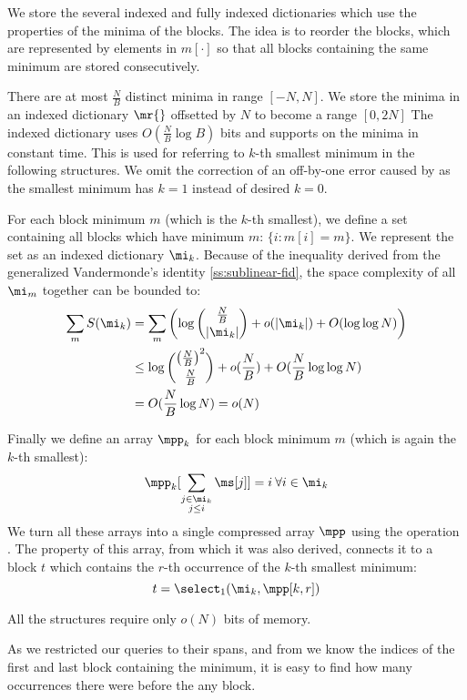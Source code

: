 We store the several indexed and fully indexed dictionaries which use the properties of the minima of the blocks.
The idea is to reorder the blocks, which are represented by elements in $m[\cdot]$ so that all blocks containing the same minimum are stored consecutively. 

There are at most $\frac{N}{B}$ distinct minima in range $[-N, N]$.
We store the minima in an indexed dictionary $\mr{}$ offsetted by $N$ to become a range $[0, 2 N]$
The indexed dictionary uses $O(\frac{N}{B} \log B)$ bits and supports \rank{} on the minima in constant time.
This is used for referring to $k$-th smallest minimum in the following structures.
We omit the correction of an off-by-one error caused by \rank{} as the smallest minimum has $k = 1$ instead of desired $k = 0$.

For each block minimum $m$ (which is the $k$-th smallest), we define a set containing all blocks which have minimum $m$: $\{ i : m[i] = m\}$.
We represent the set as an indexed dictionary $\mi_k$.
Because of the inequality derived from the generalized Vandermonde's identity \ref{ss:sublinear-fid}, the space complexity of all $\mi_m$ together can be bounded to:
\begin{align*}
	\sum_m S(\mi_k) &= \sum_m \left( \log {\frac{N}{B} \choose |\mi_k|} + o(|\mi_k|) + O(\log \log N) \right) \\
	&\le \log {\left(\frac{N}{B}\right)^2 \choose \frac{N}{B}} + o(\frac{N}{B}) + O(\frac{N}{B} \log \log N) \\
	&= O(\frac{N}{B} \log N) = o(N)
\end{align*}

Finally we define an array $\mpp_k$ for each block minimum $m$ (which is again the $k$-th smallest):
$$\mpp_k[\sum_{\substack{j \in \mi_k \\ j \le i}} \ms[j] ] = i \:\forall i \in \mi_k$$
We turn all these arrays into a single compressed array $\mpp$ using the operation \succ{}.
The property of this array, from which it was also derived, connects it to a block $t$ which contains the $r$-th occurrence of the $k$-th smallest minimum:
$$ t = \select_1(\mi_k, \mpp[k, r]) $$

All the structures require only $o(N)$ bits of memory.

\bigbreak

As we restricted our queries to their spans, and from \rmqiSpan{} we know the indices of the first and last block containing the minimum, it is easy to find how many occurrences there were before the any block.

